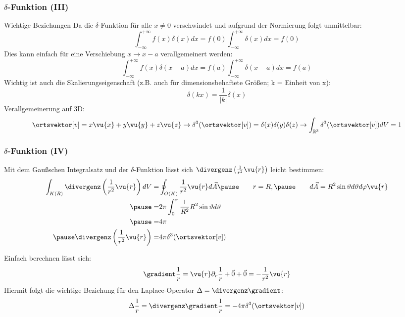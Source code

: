 \begin{frame}
  \frametitle{$\delta$-Funktion (III)}
  \begin{block}{Wichtige Beziehungen}
\pause Da die $\delta$-Funktion für alle $x\neq 0$ verschwindet und aufgrund
der Normierung folgt unmittelbar:
$$
\int_{-\infty}^{+\infty} f(x) \delta(x) dx = f(0) \int_{-\infty}^{+\infty}
 \delta(x) dx =  f(0)
 $$\pause
 Dies kann einfach für eine Verschiebung $x\to x-a$ verallgemeinert
 werden:
 $$
\int_{-\infty}^{+\infty} f(x) \delta(x-a) dx = f(a) \int_{-\infty}^{+\infty}
 \delta(x-a) dx =  f(a)
 $$\pause
 Wichtig ist auch die Skalierungseigenschaft (z.B. auch für
 dimensionsbehaftete Größen; k = Einheit von x):
 $$
\delta(kx)  = \frac{1}{|k|}\delta(x)
$$\pause
Verallgemeinerung auf 3D:
$$
\ortsvektor[v] = x\vu{x} +y\vu{y}+z\vu{z} \to
\delta^3(\ortsvektor[v])=\delta(x) \delta(y) \delta(z) \to
\int_{\mathbb{R}^3} \delta^3(\ortsvektor[v]) dV = 1 
$$
 
 

\end{block}
\end{frame}
\begin{frame}
  \frametitle{$\delta$-Funktion (IV)}
Mit dem Gaußschen Integralsatz und der $\delta$-Funktion lässt sich
$\divergenz\left(\frac{1}{r^2}\vu{r}\right)$ leicht bestimmen:
\begin{align*}
  \int_{K(R)} \divergenz\left(\frac{1}{r^2}\vu{r}\right) dV = &
                                                             \oint_{O(K)}
                                                             \frac{1}{r^2}\vu{r}
                                                             d\vec{A}\pause
                                                             \qquad r=R,\pause
                                                            \qquad d\vec{A} =
                                                             R^2
                                                             \sin\vartheta
                                                             d\vartheta
                                                             d\varphi
                                                              \vu{r}
  \\\pause
  = & 2\pi \int_0^\pi \frac{1}{R^2} R^2 \sin\vartheta d\vartheta \\
  \pause
  = & 4\pi \\\pause
  \divergenz\left(\frac{1}{r^2}\vu{r}\right)  =& 4\pi\delta^3(\ortsvektor[v])
\end{align*}\pause

Einfach berechnen lässt sich:
$$
\gradient \frac{1}{r} = \vu{r} \partial_r \frac{1}{r} + \vec{0} + \vec{0} =-\frac{1}{r^2} \vu{r}
$$\pause
Hiermit folgt die wichtige Beziehung für den \alert{Laplace-Operator}
$\Delta = \divergenz\gradient$:
$$
\Delta \frac{1}{r} = \divergenz\gradient \frac{1}{r} = -4\pi\delta^3(\ortsvektor[v]) 
$$
\end{frame}
